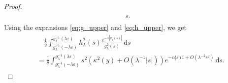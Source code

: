 \documentclass[11pt]{article}
\numberwithin{statement}{section}
\numberwithin{equation}{section}
\theoremstyle{remark}
\newcommand{\intd}{\, \mathrm{d}} 				%
\newcommand{\eps}{\varepsilon}
\begin{document}
\begin{proof}
\begin{align}
\begin{split}
            s.
	  \end{split}
	\end{align}
	Using the expansions \eqref{eq:g_upper} and \eqref{eq:h_upper},
        we get
	\begin{align}\label{eq:first_expansion}
	  \begin{split}
            & \quad \frac{1}{2}\int_{g_\lambda^{-1}(-\lambda \eps)
            }^{g_\lambda^{-1}(\lambda \eps)} h^2_\lambda(s)
            \frac{e^{-\alpha |g_\lambda(s)|}}{g^2_\lambda(s) } \intd
            s\\ 
            & = \frac{1 }{8} \int_{g_\lambda^{-1}(-\lambda \eps)
            }^{g_\lambda^{-1}(\lambda \eps)} s^2 \left( \kappa^2(y) +
              O(\lambda^{-1} |s|)\right) e^{-\alpha |s|(1 +
              O(\lambda^{-2}s^2)} \intd s.
	  \end{split}
	 \end{align}
	 

\end{proof}
\end{document}

